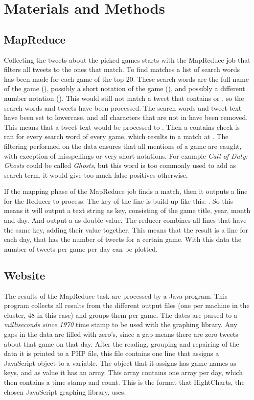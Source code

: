 \section{Materials and Methods}
\subsection{MapReduce}
Collecting the tweets about the picked games starts with the MapReduce job that filters all tweets to the ones that match. To find matches a list of search words has been made for each game of the top 20. These search words are the full name of the game (), possibly a short notation of the game (), and possibly a different number notation (). This would still not match a tweet that contains  or , so the search words and tweets have been processed. The search words and tweet text have been set to lowercase, and all characters that are not in  have been removed. This means that a tweet text  would be processed to . Then a contains check is ran for every search word of every game, which results in a match at . The filtering performed on the data ensures that all mentions of a game are caught, with exception of misspellings or very short notations. For example \emph{Call of Duty: Ghosts} could be called \emph{Ghosts}, but this word is too commonly used to add as search term, it would give too much false positives otherwise.

If the mapping phase of the MapReduce job finds a match, then it outputs a line for the Reducer to process. The key of the line is build up like this: . So this means it will output a text string as key, consisting of the game title, year, month and day. And output a  as double value. The reducer combines all lines that have the same key, adding their value together. This means that the result is a line for each day, that has the number of tweets for a certain game. With this data the number of tweets per game per day can be plotted.

\subsection{Website}
The results of the MapReduce task are processed by a Java program. This program collects all results from the different output files (one per machine in the cluster, 48 in this case) and groups them per game. The dates are parsed to a \emph{milliseconds since 1970} time stamp to be used with the graphing library. Any gaps in the data are filled with zero's, since a gap means there are zero tweets about that game on that day. After the reading, grouping and repairing of the data it is printed to a PHP file, this file contains one line that assigns a JavaScript object to a variable. The object that it assigns has game names as keys, and as value it has an array. This array contains one array per day, which then contains a time stamp and count. This is the format that HightCharts, the chosen JavaScript graphing library, uses.

